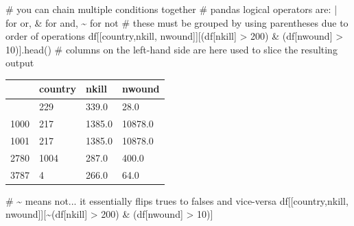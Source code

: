 \documentclass[
  letterpaper,
  DIV=11,
  numbers=noendperiod]{scrreprt}
\newenvironment{Shaded}{\begin{snugshade}}{\end{snugshade}}
\newcommand{\CommentTok}[1]{\textcolor[rgb]{0.37,0.37,0.37}{#1}}
\newcommand{\DecValTok}[1]{\textcolor[rgb]{0.68,0.00,0.00}{#1}}
\newcommand{\NormalTok}[1]{\textcolor[rgb]{0.00,0.23,0.31}{#1}}
\newcommand{\OperatorTok}[1]{\textcolor[rgb]{0.37,0.37,0.37}{#1}}
\newcommand{\StringTok}[1]{\textcolor[rgb]{0.13,0.47,0.30}{#1}}
\begin{document}
\begin{Shaded}
\begin{Highlighting}[]
\CommentTok{\# you can chain multiple conditions together}
\CommentTok{\# pandas logical operators are: | for or, \& for and, \textasciitilde{} for not}
\CommentTok{\# these must be grouped by using parentheses due to order of operations}
\NormalTok{df[[}\StringTok{\textquotesingle{}country\textquotesingle{}}\NormalTok{,}\StringTok{\textquotesingle{}nkill\textquotesingle{}}\NormalTok{, }\StringTok{\textquotesingle{}nwound\textquotesingle{}}\NormalTok{]][(df[}\StringTok{\textquotesingle{}nkill\textquotesingle{}}\NormalTok{] }\OperatorTok{\textgreater{}} \DecValTok{200}\NormalTok{) }\OperatorTok{\&}\NormalTok{ (df[}\StringTok{\textquotesingle{}nwound\textquotesingle{}}\NormalTok{] }\OperatorTok{\textgreater{}} \DecValTok{10}\NormalTok{)].head()}
\CommentTok{\# columns on the left{-}hand side are here used to slice the resulting output}
\end{Highlighting}
\end{Shaded}

\begin{longtable}[]{@{}llll@{}}
\toprule\noalign{}
& country & nkill & nwound \\
\midrule\noalign{}
\endhead
\bottomrule\noalign{}
\endlastfoot
427 & 229 & 339.0 & 28.0 \\
1000 & 217 & 1385.0 & 10878.0 \\
1001 & 217 & 1385.0 & 10878.0 \\
2780 & 1004 & 287.0 & 400.0 \\
3787 & 4 & 266.0 & 64.0 \\
\end{longtable}

\begin{Shaded}
\begin{Highlighting}[]
\CommentTok{\# \textasciitilde{} means not... it essentially flips trues to falses and vice{-}versa}
\NormalTok{df[[}\StringTok{\textquotesingle{}country\textquotesingle{}}\NormalTok{,}\StringTok{\textquotesingle{}nkill\textquotesingle{}}\NormalTok{, }\StringTok{\textquotesingle{}nwound\textquotesingle{}}\NormalTok{]][}\OperatorTok{\textasciitilde{}}\NormalTok{(df[}\StringTok{\textquotesingle{}nkill\textquotesingle{}}\NormalTok{] }\OperatorTok{\textgreater{}} \DecValTok{200}\NormalTok{) }\OperatorTok{\&}\NormalTok{ (df[}\StringTok{\textquotesingle{}nwound\textquotesingle{}}\NormalTok{] }\OperatorTok{\textgreater{}} \DecValTok{10}\NormalTok{)]}
\end{Highlighting}
\end{Shaded}
\end{document}
